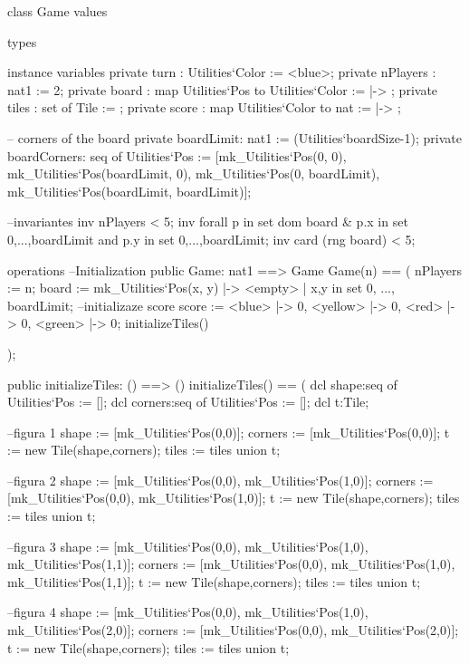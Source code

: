 \begin{vdm_al}
class Game
 values
  
 types
 
 instance variables
  private turn : Utilities`Color := <blue>;
  private nPlayers : nat1 := 2;
  private board : map Utilities`Pos to Utilities`Color := { |-> };
  private tiles : set of Tile := {};
  private score : map Utilities`Color to nat := { |-> };
  
  -- corners of the board
  private boardLimit: nat1 := (Utilities`boardSize-1);
  private boardCorners: seq of Utilities`Pos := [mk_Utilities`Pos(0, 0),
          mk_Utilities`Pos(boardLimit, 0), mk_Utilities`Pos(0, boardLimit),
          mk_Utilities`Pos(boardLimit, boardLimit)];
  
  --invariantes
  inv nPlayers < 5;
  inv forall p in set dom board & p.x in set {0,...,boardLimit} and p.y in set {0,...,boardLimit};
  inv card (rng board) < 5;
  
 operations
        --Initialization
        public Game: nat1 ==> Game
         Game(n) == (
          nPlayers := n;
                board := { mk_Utilities`Pos(x, y) |-> <empty> | x,y in set {0, ..., boardLimit}};
                --initializaze score
    score := {<blue> |-> 0, <yellow> |-> 0, <red> |-> 0, <green> |-> 0};
             initializeTiles()
             
         );
        
        public initializeTiles: () ==> ()
         initializeTiles() ==
         (          
          dcl shape:seq of Utilities`Pos := [];
          dcl corners:seq of Utilities`Pos := [];
          dcl t:Tile;
          
          --figura 1
          shape := [mk_Utilities`Pos(0,0)];
          corners := [mk_Utilities`Pos(0,0)];
          t := new Tile(shape,corners); 
          tiles := tiles union {t};
          
          --figura 2
          shape := [mk_Utilities`Pos(0,0), mk_Utilities`Pos(1,0)];
          corners := [mk_Utilities`Pos(0,0), mk_Utilities`Pos(1,0)];
          t := new Tile(shape,corners); 
          tiles := tiles union {t};
          
          --figura 3
          shape := [mk_Utilities`Pos(0,0), mk_Utilities`Pos(1,0), mk_Utilities`Pos(1,1)];
          corners := [mk_Utilities`Pos(0,0), mk_Utilities`Pos(1,0), mk_Utilities`Pos(1,1)];
          t := new Tile(shape,corners); 
          tiles := tiles union {t};
          
          --figura 4
          shape := [mk_Utilities`Pos(0,0), mk_Utilities`Pos(1,0), mk_Utilities`Pos(2,0)];
          corners := [mk_Utilities`Pos(0,0), mk_Utilities`Pos(2,0)];
          t := new Tile(shape,corners); 
          tiles := tiles union {t};
          

\end{vdm_al}

